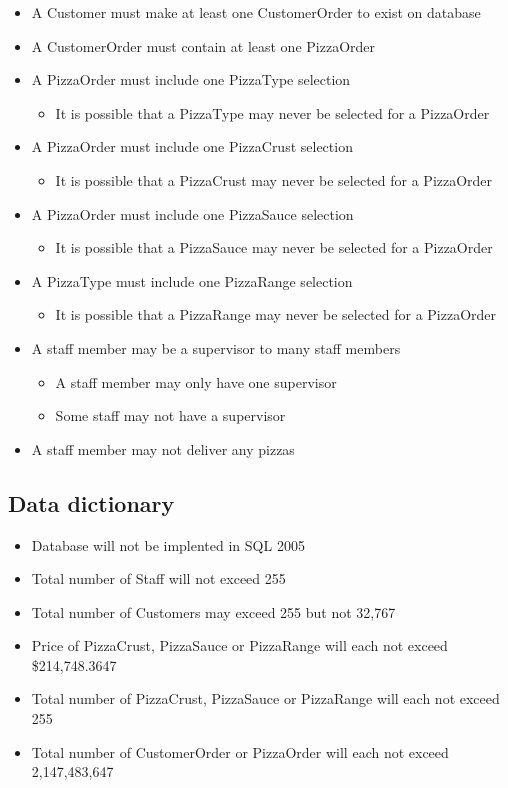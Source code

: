 \begin{itemize}
\item A Customer must make at least one CustomerOrder to exist on database
\item A CustomerOrder must contain at least one PizzaOrder
\item A PizzaOrder must include one PizzaType selection
	\begin{itemize}
	\item It is possible that a PizzaType may never be selected for a PizzaOrder
	\end{itemize}
\item A PizzaOrder must include one PizzaCrust selection
	\begin{itemize}
	\item It is possible that a PizzaCrust may never be selected for a PizzaOrder
	\end{itemize}
\item A PizzaOrder must include one PizzaSauce selection
	\begin{itemize}
	\item It is possible that a PizzaSauce may never be selected for a PizzaOrder
	\end{itemize}
\item A PizzaType must include one PizzaRange selection
	\begin{itemize}
	\item It is possible that a PizzaRange may never be selected for a PizzaOrder
	\end{itemize}
\item A staff member may be a supervisor to many staff members
	\begin{itemize}
	\item A staff member may only have one supervisor
	\item Some staff may not have a supervisor
	\end{itemize}
\item A staff member may not deliver any pizzas
\end{itemize}

\subsection{Data dictionary}

\begin{itemize}
\item Database will not be implented in SQL 2005
\item Total number of Staff will not exceed 255
\item Total number of Customers may exceed 255 but not 32,767
\item Price of PizzaCrust, PizzaSauce or PizzaRange will each not exceed \$214,748.3647
\item Total number of PizzaCrust, PizzaSauce or PizzaRange will each not exceed 255
\item Total number of CustomerOrder or PizzaOrder will each not exceed 2,147,483,647
\end{itemize}